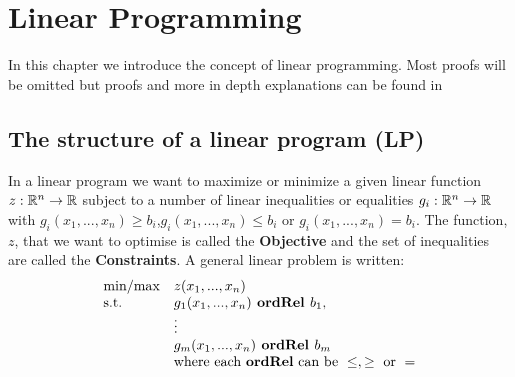 \chapter{Linear Programming}
In this chapter we introduce the concept of linear programming. Most proofs will be omitted but proofs and more in depth explanations can be found in ~\cite{vanderbei2015linear}
\section{The structure of a linear program (LP)}
In a linear program we want to maximize or minimize a given linear function $z:\mathbb{R}^n \rightarrow \mathbb{R}$ subject to a number of linear inequalities or equalities $g_i:\mathbb{R}^n \rightarrow \mathbb{R}$ with $g_i(x_1,...,x_n)\geq b_i$,$g_i(x_1,...,x_n)\leq b_i$ or $g_i(x_1,...,x_n)= b_i$. The function, $z$, that we want to optimise is called the \textbf{Objective} and the set of inequalities are called the \textbf{Constraints}. A general linear problem is written:
\begin{align}\label{lpform}
\begin{array}{ll@{}ll}
\text{min/max} &z(x_1,...,x_n)&\\
\text{s.t.} &g_1(x_1,...,x_n) \textbf{ ordRel } b_1,&\\
&\vdots&\\
&g_m(x_1,...,x_n) \textbf{ ordRel } b_m&\\
&\text{where each \textbf{ordRel} can be }\leq,\geq \text{ or } =&
\end{array}
\end{align}

